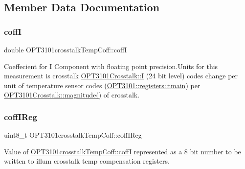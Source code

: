 \subsection{Member Data Documentation}
\mbox{\label{class_o_p_t3101crosstalk_temp_coff_ac111d5555887277804f4b0ee8f555349}} 
\subsubsection{\texorpdfstring{coffI}{coffI}}
{\footnotesize\ttfamily double O\+P\+T3101crosstalk\+Temp\+Coff\+::coffI}



Coeffecient for I Component with floating point precision.\+Units for this measurement is crosstalk \mbox{\hyperlink{class_o_p_t3101_crosstalk_a382c8271e35b33821b22d612466c96c7}{O\+P\+T3101\+Crosstalk\+::I}} (24 bit level) codes change per unit of temperature sensor codes (\mbox{\hyperlink{class_o_p_t3101_1_1registers_a3dfd8d81d4cb04d274007deb7c6122fc}{O\+P\+T3101\+::registers\+::tmain}}) per \mbox{\hyperlink{class_o_p_t3101_crosstalk_acb6217116c652bc7c0c84e7b86504f18}{O\+P\+T3101\+Crosstalk\+::magnitude()}} of crosstalk. 

\mbox{\label{class_o_p_t3101crosstalk_temp_coff_a5dd870ca86bfb7314dfaa636654d797e}} 
\subsubsection{\texorpdfstring{coff\+I\+Reg}{coffIReg}}
{\footnotesize\ttfamily uint8\+\_\+t O\+P\+T3101crosstalk\+Temp\+Coff\+::coff\+I\+Reg}



Value of \mbox{\hyperlink{class_o_p_t3101crosstalk_temp_coff_ac111d5555887277804f4b0ee8f555349}{O\+P\+T3101crosstalk\+Temp\+Coff\+::coffI}} represented as a 8 bit number to be written to illum crosstalk temp compensation registers. 

\mbox{\label{class_o_p_t3101crosstalk_temp_coff_a6d2ce80b4e1936571777185f302305b5}} 

